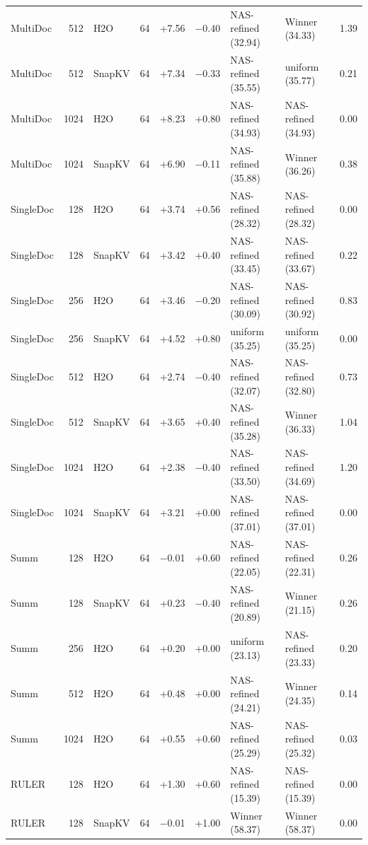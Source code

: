 \begin{table}[t]
\begin{tabular}{@{}l r l r r r l l r@{}}
    MultiDoc & 512 & H2O & 64 & +7.56 & $-$0.40 & NAS-refined (32.94) & Winner (34.33) & 1.39 \\
    MultiDoc & 512 & SnapKV & 64 & +7.34 & $-$0.33 & NAS-refined (35.55) & uniform (35.77) & 0.21 \\
    MultiDoc & 1024 & H2O & 64 & +8.23 & +0.80 & NAS-refined (34.93) & NAS-refined (34.93) & 0.00 \\
    MultiDoc & 1024 & SnapKV & 64 & +6.90 & $-$0.11 & NAS-refined (35.88) & Winner (36.26) & 0.38 \\
    SingleDoc & 128 & H2O & 64 & +3.74 & +0.56 & NAS-refined (28.32) & NAS-refined (28.32) & 0.00 \\
    SingleDoc & 128 & SnapKV & 64 & +3.42 & +0.40 & NAS-refined (33.45) & NAS-refined (33.67) & 0.22 \\
    SingleDoc & 256 & H2O & 64 & +3.46 & $-$0.20 & NAS-refined (30.09) & NAS-refined (30.92) & 0.83 \\
    SingleDoc & 256 & SnapKV & 64 & +4.52 & +0.80 & uniform (35.25) & uniform (35.25) & 0.00 \\
    SingleDoc & 512 & H2O & 64 & +2.74 & $-$0.40 & NAS-refined (32.07) & NAS-refined (32.80) & 0.73 \\
    SingleDoc & 512 & SnapKV & 64 & +3.65 & +0.40 & NAS-refined (35.28) & Winner (36.33) & 1.04 \\
    SingleDoc & 1024 & H2O & 64 & +2.38 & $-$0.40 & NAS-refined (33.50) & NAS-refined (34.69) & 1.20 \\
    SingleDoc & 1024 & SnapKV & 64 & +3.21 & +0.00 & NAS-refined (37.01) & NAS-refined (37.01) & 0.00 \\
    Summ & 128 & H2O & 64 & $-$0.01 & +0.60 & NAS-refined (22.05) & NAS-refined (22.31) & 0.26 \\
    Summ & 128 & SnapKV & 64 & +0.23 & $-$0.40 & NAS-refined (20.89) & Winner (21.15) & 0.26 \\
    Summ & 256 & H2O & 64 & +0.20 & +0.00 & uniform (23.13) & NAS-refined (23.33) & 0.20 \\
    Summ & 512 & H2O & 64 & +0.48 & +0.00 & NAS-refined (24.21) & Winner (24.35) & 0.14 \\
    Summ & 1024 & H2O & 64 & +0.55 & +0.60 & NAS-refined (25.29) & NAS-refined (25.32) & 0.03 \\
    RULER & 128 & H2O & 64 & +1.30 & +0.60 & NAS-refined (15.39) & NAS-refined (15.39) & 0.00 \\
    RULER & 128 & SnapKV & 64 & $-$0.01 & +1.00 & Winner (58.37) & Winner (58.37) & 0.00 \\

\end{tabular}
\end{table}
